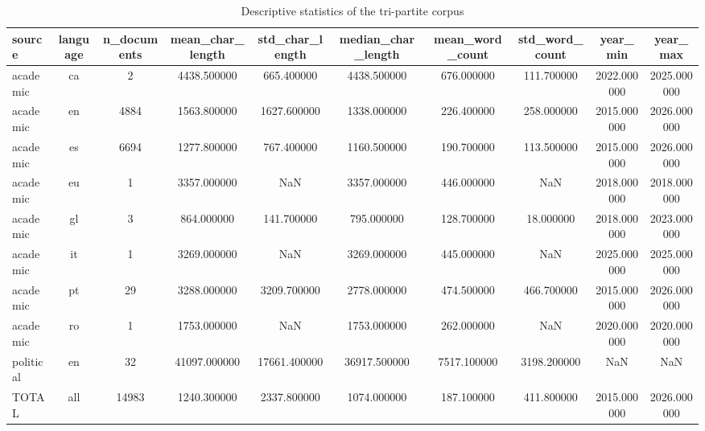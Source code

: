 \begin{table}
\caption{Descriptive statistics of the tri-partite corpus}
\label{tab:table1_corpus_summary}
\begin{tabular}{lccccccccc}
\toprule
source & language & n\_documents & mean\_char\_length & std\_char\_length & median\_char\_length & mean\_word\_count & std\_word\_count & year\_min & year\_max \\
\midrule
academic & ca & 2 & 4438.500000 & 665.400000 & 4438.500000 & 676.000000 & 111.700000 & 2022.000000 & 2025.000000 \\
academic & en & 4884 & 1563.800000 & 1627.600000 & 1338.000000 & 226.400000 & 258.000000 & 2015.000000 & 2026.000000 \\
academic & es & 6694 & 1277.800000 & 767.400000 & 1160.500000 & 190.700000 & 113.500000 & 2015.000000 & 2026.000000 \\
academic & eu & 1 & 3357.000000 & NaN & 3357.000000 & 446.000000 & NaN & 2018.000000 & 2018.000000 \\
academic & gl & 3 & 864.000000 & 141.700000 & 795.000000 & 128.700000 & 18.000000 & 2018.000000 & 2023.000000 \\
academic & it & 1 & 3269.000000 & NaN & 3269.000000 & 445.000000 & NaN & 2025.000000 & 2025.000000 \\
academic & pt & 29 & 3288.000000 & 3209.700000 & 2778.000000 & 474.500000 & 466.700000 & 2015.000000 & 2026.000000 \\
academic & ro & 1 & 1753.000000 & NaN & 1753.000000 & 262.000000 & NaN & 2020.000000 & 2020.000000 \\
political & en & 32 & 41097.000000 & 17661.400000 & 36917.500000 & 7517.100000 & 3198.200000 & NaN & NaN \\
TOTAL & all & 14983 & 1240.300000 & 2337.800000 & 1074.000000 & 187.100000 & 411.800000 & 2015.000000 & 2026.000000 \\
\bottomrule
\end{tabular}
\end{table}
